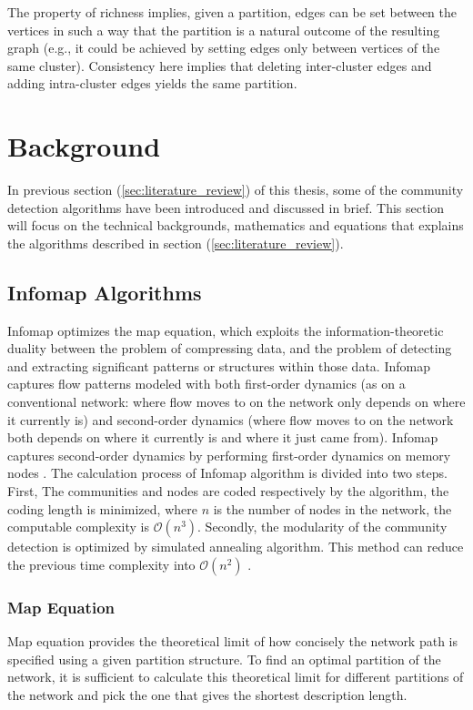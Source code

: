 The property of richness implies, given a partition, edges can be set between the vertices in such a way that the partition is a natural outcome of the resulting graph (e.g., it could be achieved by setting edges only between vertices of the same cluster). Consistency here implies that deleting inter-cluster edges and adding intra-cluster edges yields the same partition.


\section{Background}
In previous section (\ref{sec:literature_review}) of this thesis, some of the community detection algorithms have been introduced and discussed in brief. This section will focus on the technical backgrounds, mathematics and equations that explains the algorithms described in section (\ref{sec:literature_review}).

\subsection{Infomap Algorithms}\label{infomap_algorithms}
Infomap optimizes the map equation, which exploits the information-theoretic duality between the problem of compressing data, and the problem of detecting and extracting significant patterns or structures within those data. Infomap captures flow patterns modeled with both first-order dynamics (as on a conventional network: where flow moves to on the network only depends on where it currently is) and second-order dynamics (where flow moves to on the network both depends on where it currently is and where it just came from). Infomap
captures second-order dynamics by performing first-order dynamics on memory nodes \cite{ref-46}. The calculation process of Infomap algorithm is divided into two steps. First, The communities and nodes are coded respectively by the algorithm, the coding length is minimized, where $n$ is the number of nodes in the network, the computable complexity is $\mathcal{O}(n^3)$. Secondly, the modularity of the community detection is optimized by simulated annealing algorithm. This method can reduce the previous time complexity into $\mathcal{O}(n^2)$ \cite{ref-48}.

\subsubsection*{Map Equation}\label{subsec:map_equation}
Map equation provides the theoretical limit of how concisely the network path is specified using a given partition structure. To find an optimal partition of the network, it is sufficient to calculate this theoretical limit for different partitions of the network and pick the one that gives the shortest description length.

